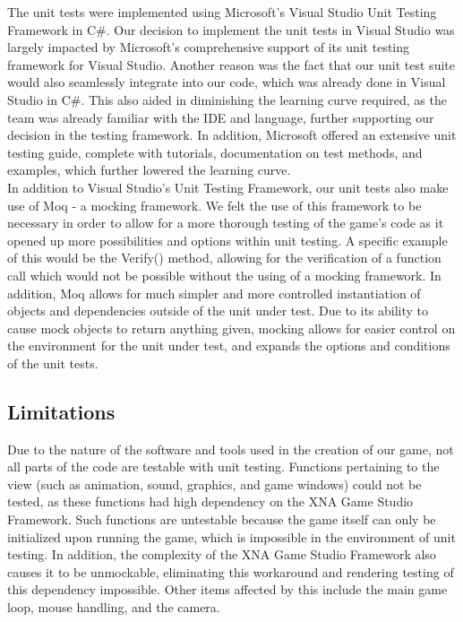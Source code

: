 \documentclass{article}
\begin{document}
The unit tests were implemented using Microsoft's Visual Studio Unit Testing Framework in C\#. Our decision to implement the unit tests in Visual Studio was largely impacted by Microsoft's comprehensive support of its unit testing framework for Visual Studio. Another reason was the fact that our unit test suite would also seamlessly integrate into our code, which was already done in Visual Studio in C\#. This also aided in diminishing the learning curve required, as the team was already familiar with the IDE and language, further supporting our decision in the testing framework. In addition, Microsoft offered an extensive unit testing guide, complete with tutorials, documentation on test methods, and examples, which further lowered the learning curve. \\

In addition to Visual Studio's Unit Testing Framework, our unit tests also make use of Moq - a mocking framework. We felt the use of this framework to be necessary in order to allow for a more thorough testing of the game's code as it opened up more possibilities and options within unit testing. A specific example of this would be the Verify() method, allowing for the verification of a function call which would not be possible without the using of a mocking framework. In addition, Moq allows for much simpler and more controlled instantiation of objects and dependencies outside of the unit under test. Due to its ability to cause mock objects to return anything given, mocking allows for easier control on the environment for the unit under test, and expands the options and conditions of the unit tests.

\subsection{Limitations}

Due to the nature of the software and tools used in the creation of our game, not all parts of the code are testable with unit testing. Functions pertaining to the view (such as animation, sound, graphics, and game windows) could not be tested, as these functions had high dependency on the XNA Game Studio Framework. Such functions are untestable because the game itself can only be initialized upon running the game, which is impossible in the environment of unit testing. In addition, the complexity of the XNA Game Studio Framework also causes it to be unmockable, eliminating this workaround and rendering testing of this dependency impossible. Other items affected by this include the main game loop, mouse handling, and the camera.
\end{document}

